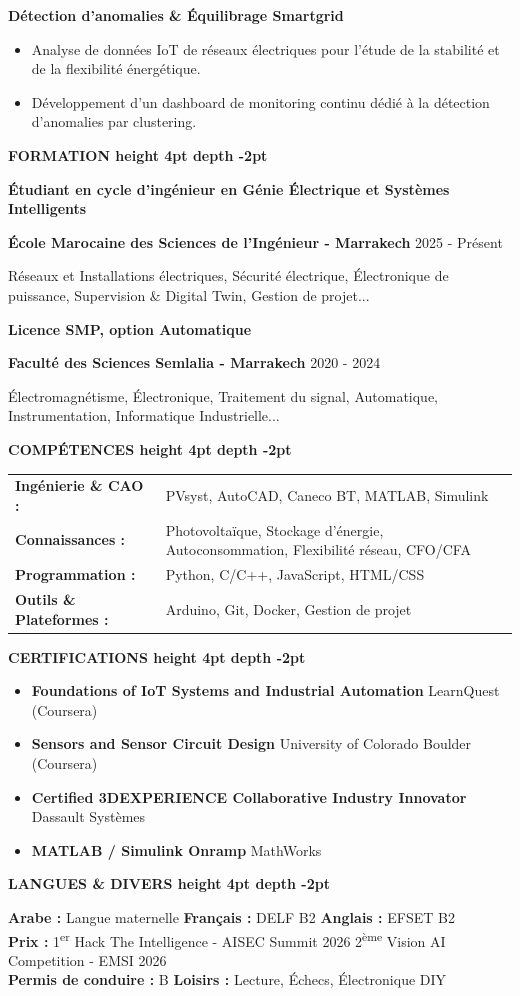 \documentclass[10pt,a4paper]{altacv}
\renewcommand{\cvsection}[2][]{%
  \medskip%
  {\color{heading}\LARGE\bfseries #2 \hspace{0.2em}\leaders\vrule height 4pt depth -2pt\hfill\mbox{}}\par\smallskip
}
\renewcommand{\cvevent}[4]{%
  {\large\bfseries\color{accent}#1\par}
  \smallskip\normalsize
  \ifstrequal{#2}{}{}{%
    \textbf{\color{emphasis}#2\ifstrequal{#4}{}{}{ - #4}}%
  }%
  \hfill
  \ifstrequal{#3}{}{}{{\small#3}}%
  \par\smallskip
}
\begin{document}
{\large\bfseries\color{accent} Détection d'anomalies \& Équilibrage Smartgrid}\\[0.05cm]
\begin{itemize}
  \item Analyse de données IoT de réseaux électriques pour l'étude de la stabilité et de la flexibilité énergétique.
  \item Développement d'un dashboard de monitoring continu dédié à la détection d'anomalies par clustering.
\end{itemize}




\cvsection{FORMATION}
\cvevent{Étudiant en cycle d'ingénieur en Génie Électrique et Systèmes Intelligents}{École Marocaine des Sciences de l'Ingénieur}{2025 - Présent}{Marrakech}
\small Réseaux et Installations électriques, Sécurité électrique, Électronique de puissance, Supervision \& Digital Twin, Gestion de projet...

\cvevent{Licence SMP, option Automatique}{Faculté des Sciences Semlalia}{2020 - 2024}{Marrakech}
\small Électromagnétisme, Électronique, Traitement du signal, Automatique, Instrumentation, Informatique Industrielle...

\cvsection{COMPÉTENCES}
\begin{tabular}{@{}ll@{}}
\textbf{Ingénierie \& CAO :} & PVsyst, AutoCAD, Caneco BT, MATLAB, Simulink \\[1pt]
\textbf{Connaissances :} & Photovoltaïque, Stockage d'énergie, Autoconsommation, Flexibilité réseau, CFO/CFA \\[1pt]
\textbf{Programmation :} & Python, C/C++, JavaScript, HTML/CSS \\[1pt]
\textbf{Outils \& Plateformes :} & Arduino, Git, Docker, Gestion de projet \\
\end{tabular}

\cvsection{CERTIFICATIONS}
\begin{itemize}[leftmargin=*, label=\textbullet, itemsep=2pt]
  \item \textbf{Foundations of IoT Systems and Industrial Automation} \hfill {\color{emphasis}LearnQuest (Coursera)}
  \item \textbf{Sensors and Sensor Circuit Design} \hfill {\color{emphasis}University of Colorado Boulder (Coursera)}
  \item \textbf{Certified 3DEXPERIENCE Collaborative Industry Innovator} \hfill {\color{emphasis}Dassault Systèmes}
  \item \textbf{MATLAB / Simulink Onramp} \hfill {\color{emphasis}MathWorks}
\end{itemize}
\cvsection{LANGUES \& DIVERS}
\textbf{Arabe :} Langue maternelle \hfill \textbf{Français :} DELF B2 \hfill \textbf{Anglais :} EFSET B2\\[2pt]
\textbf{Prix :} 1\textsuperscript{er} Hack The Intelligence - AISEC Summit 2026 \hfill 2\textsuperscript{ème} Vision AI Competition - EMSI 2026\\[2pt]
\textbf{Permis de conduire :} B \hfill \textbf{Loisirs :} Lecture, Échecs, Électronique DIY
\end{document}
